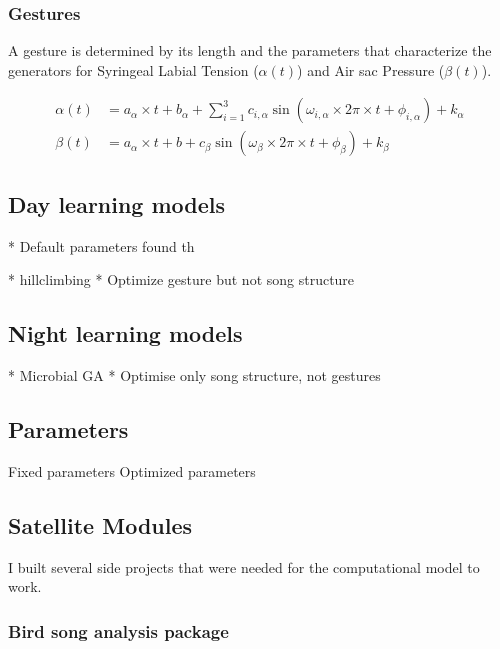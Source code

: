 \documentclass{report}
\begin{document}
\subsubsection{Gestures}

A gesture is determined by its length and the parameters that characterize the
generators for Syringeal Labial Tension (\(\alpha(t)\)) and Air sac Pressure
(\(\beta(t)\)).

\begin{align}
\alpha(t) &= a_\alpha \times t
  + b_\alpha + \sum_{i=1}^{3} c_{i,\alpha} \sin(\omega_{i,\alpha} \times 2\pi
  \times t + \phi_{i,\alpha}) + k_\alpha\\
\beta(t) &= a_\alpha \times t
  + b + c_\beta \sin(\omega_\beta \times 2\pi \times t + \phi_\beta) + k_\beta
\end{align}

\subsection{Day learning models}

* Default parameters found th

* hillclimbing
* Optimize gesture but not song structure


\subsection{Night learning models}

* Microbial GA
* Optimise only song structure, not gestures

\subsection{Parameters}

Fixed parameters
Optimized parameters

\subsection{Satellite Modules}

I built several side projects that were needed for the computational model to
work.



\subsubsection{Bird song analysis package}
\end{document}
